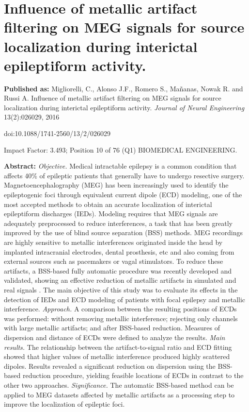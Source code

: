 \chapter[Influence of metallic artifacts during interictal epileptiform activity]{Influence of metallic artifact filtering on MEG signals for source localization during interictal epileptiform activity.}

\label{ch:4}
\textbf{Published as:} 
Migliorelli, C., Alonso J.F., Romero S., Ma\~nanas, Nowak R. and Russi A.
Influence of metallic artifact filtering on MEG signals for source localization during interictal epileptiform activity. \textit{Journal of Neural Engineering} 13(2):026029, 2016

doi:10.1088/1741-2560/13/2/026029

Impact Factor: 3.493; Position 10 of 76 (Q1) BIOMEDICAL ENGINEERING.

\textbf{Abstract:} \textit{Objective.} Medical intractable epilepsy is a common condition that affects 40\% of epileptic patients that generally have to undergo resective surgery. Magnetoencephalography (MEG) has been increasingly used to identify the epileptogenic foci through equivalent current dipole (ECD) modeling, one of the most accepted methods to obtain an accurate localization of interictal epileptiform discharges (IEDs). Modeling requires that MEG signals are adequately preprocessed to reduce interferences, a task that has been greatly improved by the use of blind source separation (BSS) methods. MEG recordings are highly sensitive to metallic interferences originated inside the head by implanted intracranial electrodes, dental prosthesis, etc and also coming from external sources such as pacemakers or vagal stimulators. To reduce these artifacts, a BSS-based fully automatic procedure was recently developed and validated, showing an effective reduction of metallic artifacts in simulated and real signals \citep{Migliorelli2015}. The main objective of this study was to evaluate its effects in the detection of IEDs and ECD modeling of patients with focal epilepsy and metallic interference. \textit{Approach.} A comparison between the resulting positions of ECDs was performed: without removing metallic interference; rejecting only channels with large metallic artifacts; and after BSS-based reduction. Measures of dispersion and distance of ECDs were defined to analyze the results. \textit{Main results.} The relationship between the artifact-to-signal ratio and ECD fitting showed that higher values of metallic interference produced highly scattered dipoles. Results revealed a significant reduction on dispersion using the BSS-based reduction procedure, yielding feasible locations of ECDs in contrast to the other two approaches. \textit{Significance.} The automatic BSS-based method can be applied to MEG datasets affected by metallic artifacts as a processing step to improve the localization of epileptic foci.

